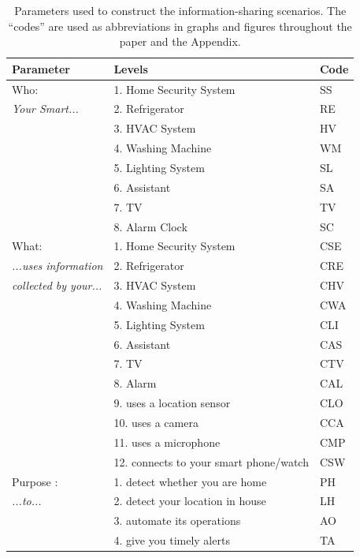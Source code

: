 \begin{table}
	\centering
	\caption{Parameters used to construct the information-sharing scenarios. The ``codes'' are used as abbreviations in graphs and figures throughout the paper and the Appendix.}
	\label{tab:parameter2}
	\begin{tabular} {l|l|l}
		\hline
		\textbf{Parameter} & \textbf{Levels} & \textbf{Code} 	 \\ \hline
		Who:  & 1. Home Security System & SS\\ 		
		\emph{Your Smart...}	& 2. Refrigerator & RE							 \\
		& 3. HVAC System							& HV	 \\
		& 4. Washing Machine						& WM		 \\
		& 5. Lighting System						& SL	 \\
		& 6. Assistant 							 &SA\\
		& 7. TV 							 &TV\\
		& 8. Alarm Clock							&SC \\ \hline
		What:  & 1. Home Security System & CSE\\
		\emph{...uses information } & 2. Refrigerator &CRE							 \\
		\emph{collected by your...} & 3. HVAC System &CHV								 \\
		& 4. Washing Machine						& CWA		 \\
		& 5. Lighting System						&CLI	 \\
		& 6. Assistant 							 & CAS\\
		& 7. TV 							 & CTV\\
		& 8. Alarm							 & CAL\\
		& 9. uses a location sensor			&CLO	\\	
		& 10. uses a camera				& CCA\\	
		& 11. uses a microphone			& CMP				\\	
		& 12. connects to your smart phone/watch &CSW				\\\hline
		Purpose : & 1. detect whether you are home & PH		\\
		\emph{...to...} & 2. detect your location in house &LH		\\				
		& 3. automate its operations &AO\\
		& 4. give you timely alerts & TA\\ \hline

\end{tabular}
\end{table}
